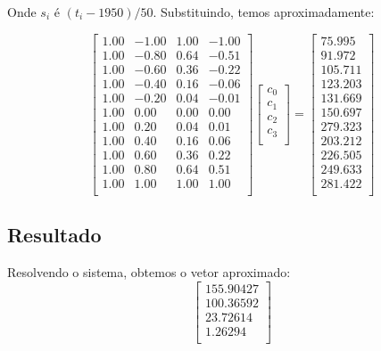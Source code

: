 \documentclass[12pt,a4paper]{article}
\begin{document}
Onde $s_i$ é $(t_i-1950)/50$. Substituindo, temos aproximadamente:

\[
\left[
\begin{array}{cccc}
    1.00 & -1.00 & 1.00 & -1.00 \\
    1.00 & -0.80 & 0.64 & -0.51 \\
    1.00 & -0.60 & 0.36 & -0.22 \\
    1.00 & -0.40 & 0.16 & -0.06 \\
    1.00 & -0.20 & 0.04 & -0.01 \\
    1.00 & 0.00 & 0.00 & 0.00 \\
    1.00 & 0.20 & 0.04 & 0.01 \\
    1.00 & 0.40 & 0.16 & 0.06 \\
    1.00 & 0.60 & 0.36 & 0.22 \\
    1.00 & 0.80 & 0.64 & 0.51 \\
    1.00 & 1.00 & 1.00 & 1.00 \\
\end{array}
\right]
\left[
\begin{array}{c}
    c_0 \\
    c_1 \\
    c_2 \\
    c_3 \\
\end{array}
\right]
=
\left[
\begin{array}{c}
    75.995 \\
    91.972 \\
    105.711 \\
    123.203 \\
    131.669 \\
    150.697 \\
    279.323 \\
    203.212 \\
    226.505 \\
    249.633 \\
    281.422 \\
\end{array}
\right]
\]

\subsection{Resultado}
Resolvendo o sistema, obtemos o vetor aproximado:
\[
\left[
\begin{array}{c}
    155.90427 \\
    100.36592 \\
    23.72614 \\
    1.26294 \\
\end{array}
\right]
\]
\end{document}
